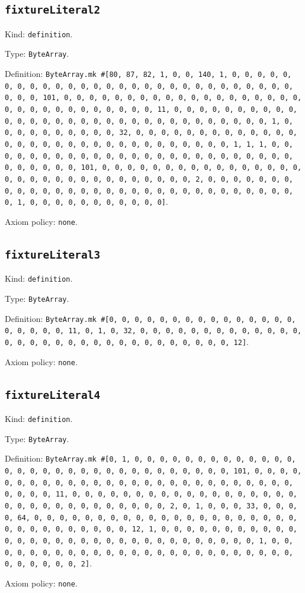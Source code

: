 \documentclass[11pt]{article}
\begin{document}
\subsection*{\texttt{fixtureLiteral2}}
\noindent Kind: \texttt{definition}.\par
\noindent Type: \texttt{ByteArray}.\par
\noindent Definition: \texttt{ByteArray.mk \#[80, 87, 82, 1, 0, 0, 140, 1, 0, 0, 0, 0, 0, 0, 0, 0, 0, 0, 0, 0, 0, 0, 0, 0, 0, 0, 0, 0, 0, 0, 0, 0, 0, 0, 0, 0, 0, 0, 0, 101, 0, 0, 0, 0, 0, 0, 0, 0, 0, 0, 0, 0, 0, 0, 0, 0, 0, 0, 0, 0, 0, 0, 0, 0, 0, 0, 0, 0, 0, 0, 0, 11, 0, 0, 0, 0, 0, 0, 0, 0, 0, 0, 0, 0, 0, 0, 0, 0, 0, 0, 0, 0, 0, 0, 0, 0, 0, 0, 0, 0, 0, 0, 0, 1, 0, 0, 0, 0, 0, 0, 0, 0, 0, 0, 32, 0, 0, 0, 0, 0, 0, 0, 0, 0, 0, 0, 0, 0, 0, 0, 0, 0, 0, 0, 0, 0, 0, 0, 0, 0, 0, 0, 0, 0, 0, 0, 1, 1, 1, 0, 0, 0, 0, 0, 0, 0, 0, 0, 0, 0, 0, 0, 0, 0, 0, 0, 0, 0, 0, 0, 0, 0, 0, 0, 0, 0, 0, 0, 0, 0, 101, 0, 0, 0, 0, 0, 0, 0, 0, 0, 0, 0, 0, 0, 0, 0, 0, 0, 0, 0, 0, 0, 0, 0, 0, 0, 0, 0, 0, 0, 0, 0, 2, 0, 0, 0, 0, 0, 0, 0, 0, 0, 0, 0, 0, 0, 0, 0, 0, 0, 0, 0, 0, 0, 0, 0, 0, 0, 0, 0, 0, 0, 0, 0, 1, 0, 0, 0, 0, 0, 0, 0, 0, 0, 0, 0]}.\par
\noindent Axiom policy: \texttt{none}.\par
\subsection*{\texttt{fixtureLiteral3}}
\noindent Kind: \texttt{definition}.\par
\noindent Type: \texttt{ByteArray}.\par
\noindent Definition: \texttt{ByteArray.mk \#[0, 0, 0, 0, 0, 0, 0, 0, 0, 0, 0, 0, 0, 0, 0, 0, 0, 0, 0, 0, 11, 0, 1, 0, 32, 0, 0, 0, 0, 0, 0, 0, 0, 0, 0, 0, 0, 0, 0, 0, 0, 0, 0, 0, 0, 0, 0, 0, 0, 0, 0, 0, 0, 0, 0, 0, 12]}.\par
\noindent Axiom policy: \texttt{none}.\par
\subsection*{\texttt{fixtureLiteral4}}
\noindent Kind: \texttt{definition}.\par
\noindent Type: \texttt{ByteArray}.\par
\noindent Definition: \texttt{ByteArray.mk \#[0, 1, 0, 0, 0, 0, 0, 0, 0, 0, 0, 0, 0, 0, 0, 0, 0, 0, 0, 0, 0, 0, 0, 0, 0, 0, 0, 0, 0, 0, 0, 0, 0, 101, 0, 0, 0, 0, 0, 0, 0, 0, 0, 0, 0, 0, 0, 0, 0, 0, 0, 0, 0, 0, 0, 0, 0, 0, 0, 0, 0, 0, 0, 0, 0, 11, 0, 0, 0, 0, 0, 0, 0, 0, 0, 0, 0, 0, 0, 0, 0, 0, 0, 0, 0, 0, 0, 0, 0, 0, 0, 0, 0, 0, 0, 0, 0, 2, 0, 1, 0, 0, 0, 33, 0, 0, 0, 0, 64, 0, 0, 0, 0, 0, 0, 0, 0, 0, 0, 0, 0, 0, 0, 0, 0, 0, 0, 0, 0, 0, 0, 0, 0, 0, 0, 0, 0, 0, 0, 0, 12, 1, 0, 0, 0, 0, 0, 0, 0, 0, 0, 0, 0, 0, 0, 0, 0, 0, 0, 0, 0, 0, 0, 0, 0, 0, 0, 0, 0, 0, 0, 0, 0, 1, 0, 0, 0, 0, 0, 0, 0, 0, 0, 0, 0, 0, 0, 0, 0, 0, 0, 0, 0, 0, 0, 0, 0, 0, 0, 0, 0, 0, 0, 0, 0, 2]}.\par
\noindent Axiom policy: \texttt{none}.\par
\end{document}
